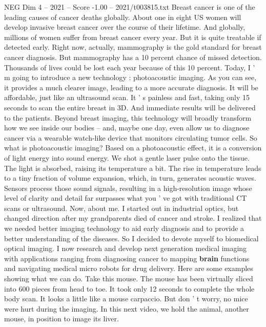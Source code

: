 \begin{textsample}{NEG Dim 4 – 2021 – Score -1.00 – 2021/t003815.txt}  \label{ex:f4_neg_050}
Breast cancer is one of the leading causes of cancer deaths globally.
About one in eight US women will develop invasive breast cancer over the course of their lifetime.
And globally, millions of women suffer from breast cancer every year.
But it is quite treatable if detected early.
Right now, actually, mammography is the gold standard for breast cancer diagnosis.
But mammography has a 10 percent chance of missed detection.
Thousands of lives could be lost each year because of this 10 percent.
Today, I ' m going to introduce a new technology : photoacoustic imaging.
As you can see, it provides a much clearer image, leading to a more accurate diagnosis.
It will be affordable, just like an ultrasound scan.
It ' s painless and fast, taking only 15 seconds to scan the entire breast in 3D.
And immediate results will be delivered to the patients.
Beyond breast imaging, this technology will broadly transform how we see inside our bodies -- and, maybe one day, even allow us to diagnose cancer via a wearable watch-like device that monitors circulating tumor cells.
So what is photoacoustic imaging?
Based on a photoacoustic effect, it is a conversion of light energy into sound energy.
We shot a gentle laser pulse onto the tissue.
The light is absorbed, raising its temperature a bit.
The rise in temperature leads to a tiny fraction of volume expansion, which, in turn, generates acoustic waves.
Sensors process those sound signals, resulting in a high-resolution image whose level of clarity and detail far surpasses what you ' ve got with traditional CT scans or ultrasound.
Now, about me.
I started out in industrial optics, but changed direction after my grandparents died of cancer and stroke.
I realized that we needed better imaging technology to aid early diagnosis and to provide a better understanding of the diseases.
So I decided to devote myself to biomedical optical imaging.
I now research and develop next generation medical imaging with applications ranging from diagnosing cancer to mapping \textbf{brain} functions and navigating medical micro robots for drug delivery.
Here are some examples showing what we can do.
Take this mouse.
The mouse has been virtually sliced into 600 pieces from head to toe.
It took only 12 seconds to complete the whole body scan.
It looks a little like a mouse carpaccio.
But don ' t worry, no mice were hurt during the imaging.
In this next video, we hold the animal, another mouse, in position to image its liver.

\end{textsample}
